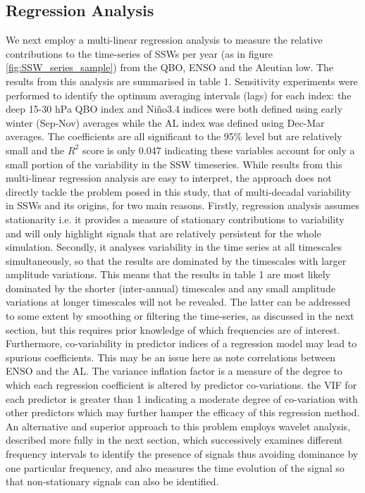 \subsection{Regression Analysis}
We next employ a multi-linear regression analysis to measure the relative contributions to the time-series of SSWs per year (as in figure \ref{fig:SSW_series_sample}) from the QBO, ENSO and the Aleutian low. The results from this analysis are summarised in table 1.  Sensitivity experiments were performed to identify the optimum averaging intervals (lags) for each index: the deep 15-30 hPa QBO index and Ni\~{n}o3.4 indices were both defined using early winter (Sep-Nov) averages while the AL index was defined using Dec-Mar averages. The coefficients are all significant to the 95\% level but are relatively small and the $R^2$ score is only 0.047 indicating these variables account for only a small portion of the variability in the SSW timeseries. While results from this multi-linear regression analysis are easy to interpret, the approach does not directly tackle the problem posed in this study, that of multi-decadal variability in SSWs and its origins, for two main reasons. Firstly, regression analysis assumes stationarity i.e. it provides a measure of stationary contributions to variability and will only highlight signals that are relatively persistent for the whole simulation. Secondly, it  analyses variability in the time series at all timescales simultaneously, so that the results are dominated by the timescales with larger amplitude variations.  This means that the results in table 1 are most likely dominated by the shorter (inter-annual) timescales and any small amplitude variations at longer timescales will not be revealed. The latter can be addressed to some extent by smoothing or filtering the time-series, as discussed in the next section, but this requires prior knowledge of which frequencies are of interest. Furthermore, co-variability in predictor indices of a regression model may lead to spurious coefficients. This may be an issue here as \cite{raoModulation2019} note correlations between ENSO and the AL. The variance inflation factor is a measure of the degree to which each regression coefficient is altered by predictor co-variations. the VIF for each predictor is greater than 1 indicating a moderate degree of co-variation with other predictors \citep{akinwandeVariance2015} which may further hamper the efficacy of this regression method. An alternative and superior approach to this problem employs wavelet analysis, described more fully in the next section, which successively examines different frequency intervals to identify the presence of signals thus avoiding dominance by one particular frequency, and also measures the time evolution of the signal so that non-stationary signals can also be identified. 

